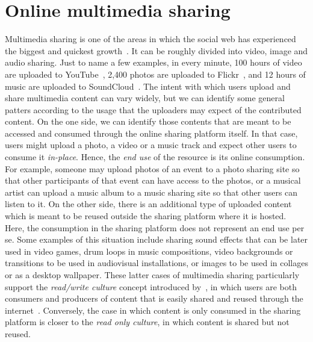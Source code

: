 

\section{Online multimedia sharing}

Multimedia sharing is one of the areas in which the social web has experienced the biggest and quickest growth~\citep{Smith2009}. It can be roughly divided into video, image and audio sharing.
Just to name a few examples, in every minute, 100 hours of video are uploaded to YouTube~\citep{TheYouTubeTeam2013}, 2,400 photos are uploaded to Flickr~\citep{Jeffries2013}, and 12 hours of music are uploaded to SoundCloud~\citep{Wahlforss2013}. %
The intent with which users upload and share multimedia content can vary widely, but we can identify some general patters according to the usage that the uploaders may expect of the contributed content. On the one side, we can identify those contents that are meant to be accessed and consumed through the online sharing platform itself. In that case, users might upload a photo, a video or a music track and expect other users to consume it \emph{in-place}. Hence, the \emph{end use} of the resource is its online consumption. For example, someone may upload photos of an event to a photo sharing site so that other participants of that event can have access to the photos, or a musical artist can upload a music album to a music sharing site so that other users can listen to it.
On the other side, there is an additional type of uploaded content which is meant to be reused outside the sharing platform where it is hosted. Here, the consumption in the sharing platform does not represent an end use per se. Some examples of this situation include sharing sound effects that can be later used in video games, drum loops in music compositions, video backgrounds or transitions to be used in audiovisual installations, or images to be used in collages or as a desktop wallpaper.
These latter cases of multimedia sharing particularly support the \emph{read/write culture} concept introduced by~\cite{lessing2008}, in which users are both consumers and producers of content that is easily shared and reused through the internet~\citep{wikipedia_remix_cultrue}. Conversely, the case in which content is only consumed in the sharing platform is closer to the \emph{read only culture}, in which content is shared but not reused. 

